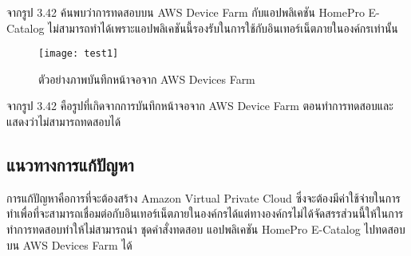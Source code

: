 จากรูป 3.42 ค้นพบว่าการทดสอบบน AWS Device Farm กับแอปพลิเคชัน HomePro E-Catalog ไม่สามารถทำได้เพราะแอปพลิเคชันนี้รองรับในการใช้กับอินเทอร์เน็ตภายในองค์กรเท่านั้น


\begin{figure}[H]
    \centering
    \texttt{[image: test1]}
    \caption{ตัวอย่างภาพบันทึกหน้าจอจาก AWS Devices Farm}
    \label{Fig:90}
\end{figure}

จากรูป 3.42 คือรูปที่เกิดจากการบันทึกหน้าจอจาก AWS Device Farm ตอนทำการทดสอบและแสดงว่าไม่สามารถทดสอบได้

\subsection{แนวทางการแก้ปัญหา}
การแก้ปัญหาคือการที่จะต้องสร้าง Amazon Virtual Private Cloud ซึ่งจะต้องมีค่าใช้จ่ายในการทำเพื่อที่จะสามารถเชื่อมต่อกับอินเทอร์เน็ตภายในองค์กรได้แต่ทางองค์กรไม่ได้จัดสรรส่วนนี้ให้ในการทำการทดสอบทำให้ไม่สามารถนำ ชุดคำสั่งทดสอบ แอปพลิเคชัน HomePro E-Catalog ไปทดสอบบน AWS Devices Farm ได้

